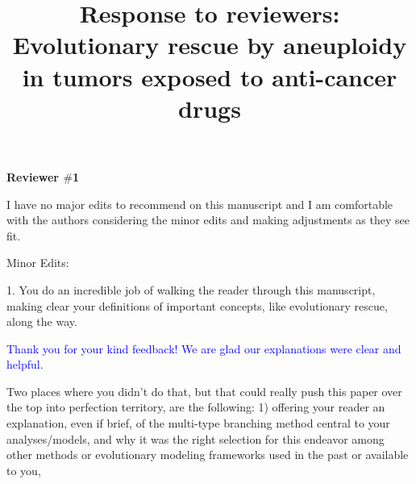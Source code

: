\documentclass[12pt]{extarticle}
\title{
	Response to reviewers: \\ Evolutionary rescue by aneuploidy in tumors exposed to anti-cancer drugs \\ 
}
\begin{document}
\maketitle

\textbf{Reviewer $\#$1}



I have no major edits to recommend on this manuscript and I am comfortable with the authors considering the minor edits and making adjustments as they see fit.

Minor Edits:

1. You do an incredible job of walking the reader through this manuscript, making clear your definitions of important concepts, like evolutionary rescue, along the way. 

\textcolor{blue}{Thank you for your kind feedback! We are glad our explanations were clear and helpful.}

Two places where you didn't do that, but that could really push this paper over the top into perfection territory, are the following: 1) offering your reader an explanation, even if brief, of the multi-type branching method central to your analyses/models, and why it was the right selection for this endeavor among other methods or evolutionary modeling frameworks used in the past or available to you,
\end{document}
